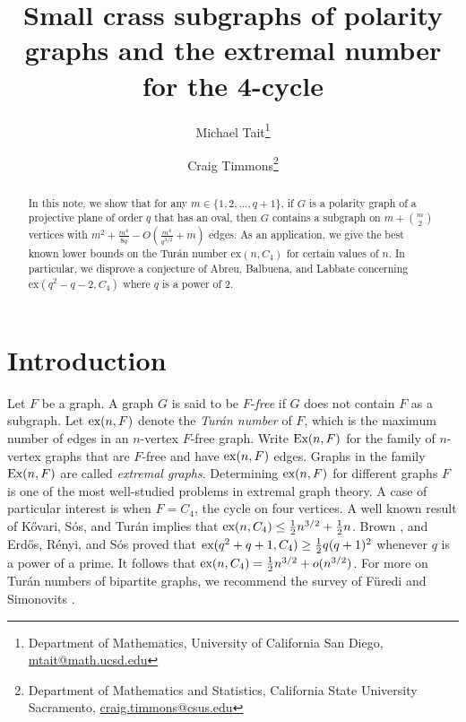 \documentclass[12pt]{article}
\title{Small crass subgraphs of polarity graphs and the extremal number for the 4-cycle}
\author{
    Michael Tait\thanks{Department of Mathematics, University of California San Diego, \url{mtait@math.ucsd.edu}}
    \and
    Craig Timmons\thanks{Department of Mathematics and Statistics, California State University Sacramento, \mbox{\url{craig.timmons@csus.edu}}}
}
\date{}
\begin{document}
\maketitle
\vspace{-5mm}

\begin{abstract}
    In this note, we show that for any $m \in \{1,2, \dots , q +1 \}$, if $G$ is a polarity graph of a projective plane of order $q$ that has an oval, then $G$ contains a subgraph on $m + \binom{m}{2}$ vertices with $m^2+\frac{m^4}{8q} - O ( \frac{m^4}{q^{3/2} } +m )$ edges. As an application, we give the best known lower bounds on the Tur\'{a}n number $\mathrm{ex}(n, C_4)$ for certain values of $n$. In particular, we disprove a conjecture of Abreu, Balbuena, and Labbate concerning $\mathrm{ex}(q^2-q-2, C_4)$ where $q$ is a power of $2$.
\end{abstract}

\section{Introduction}

Let $F$ be a graph.  A graph $G$ is said to be $F$-\emph{free} if $G$ does not contain $F$ as a subgraph.  Let $\textup{ex}(n , F)$ denote the \emph{Tur\'{a}n number} of $F$, which is the maximum number of edges in an $n$-vertex $F$-free graph.  Write $\textup{Ex}(n  , F)$ for the family of $n$-vertex graphs that are $F$-free and have $\textup{ex}(n , F)$ edges.  Graphs in the family $\textup{Ex}(n , F)$ are called \emph{extremal graphs}.  Determining $\textup{ex}( n , F)$ for different graphs $F$ is one of the most well-studied problems in extremal graph theory.  A case of particular interest is when $F = C_4$, the cycle on four vertices.  A well known result of K\H{o}vari, S\'{o}s, and Tur\'{a}n \cite{kHovari1954problem} implies that $\textup{ex}(n , C_4) \leq \frac{1}{2} n^{3/2} + \frac{1}{2}n$.  Brown \cite{brown1966graphs}, and Erd\H{o}s, R\'{e}nyi, and S\'{o}s \cite{erd1966r} proved that
$\textup{ex}( q^2 + q + 1 , C_4) \geq \frac{1}{2} q (q + 1)^2$ whenever $q$ is a power of a prime.  It follows that
$\textup{ex}(n , C_4) = \frac{1}{2} n^{3/2} + o( n^{3/2} )$.  For more on Tur\'{a}n numbers of bipartite graphs, we recommend the survey of F\"{u}redi and Simonovits \cite{furedi2013history}.
\end{document}

